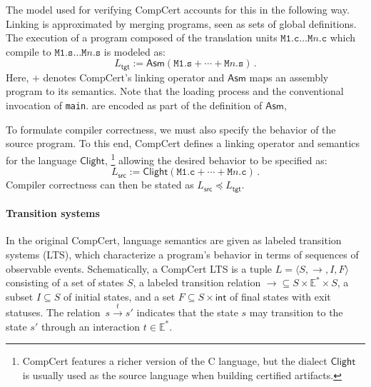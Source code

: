 \documentclass[sigplan,screen,review]{acmart}
\newcommand{\kw}[1]{\ensuremath{ \mathsf{#1} }}
\newcommand{\refby}{\preceq}
\newcommand{\opt}[2]{#1}
\newcommand{\opt}[2]{#2}
\begin{document}
The model used for verifying CompCert accounts for this
    {in the following way.}
Linking is approximated by
merging programs, seen as sets of global definitions.
The execution
of a program composed of the translation units
$\texttt{M1.c} \ldots \texttt{M$n$.c}$
which compile to
$\texttt{M1.s} \ldots \texttt{M$n$.s}$
is modeled as:
\[
    L_\kw{tgt} :=
    \kw{Asm}(\texttt{M1.s} +
             \cdots +
             \texttt{M$n$.s}) \,.
\]
Here,
$+$ denotes CompCert's linking operator and
$\kw{Asm}$ maps an assembly program to its semantics.
Note that the loading process
and the conventional invocation of \texttt{main}.
are encoded as part of the definition of $\kw{Asm}$,

To formulate compiler correctness,
we must also specify the behavior of the source program.
To this end,
CompCert defines a linking operator
and semantics
for the language $\kw{Clight}$,%
\footnote{
  CompCert features a richer version of the C language,
  but the dialect \kw{Clight}
  is usually used as the source language
  when building certified artifacts.
}
allowing the desired behavior to be specified as:
\[
    L_\kw{src} :=
    \kw{Clight}(\texttt{M1.c} + \cdots + \texttt{M$n$.c}) \,.
\]
Compiler correctness
can then be stated as $L_\kw{src} \refby L_\kw{tgt}$.


\paragraph{Transition systems} %

In the original CompCert, language semantics are
given as labeled transition systems (LTS),
which characterize a program's behavior in terms of
sequences of observable events.
Schematically, a CompCert LTS
is a tuple
$L = \langle S, {\rightarrow}, I, F \rangle$
consisting of
a set of states $S$,
a labeled transition relation
${\rightarrow} \subseteq S \times \mathbb{E}^* \times S$,
a subset $I \subseteq S$ of initial states,
and a set
$F \subseteq S \times \kw{int}$
of final states with exit statuses.
The relation~$s \stackrel{t}{\rightarrow} s'$
indicates that the state $s$ may transition to the state $s'$
through an interaction $t \in \mathbb{E}^*$.
\end{document}
